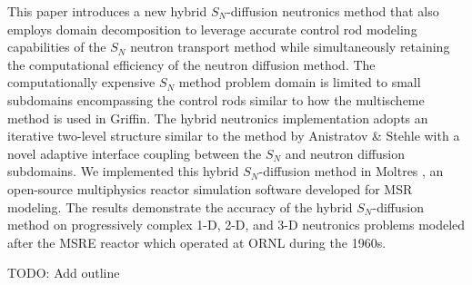 This paper introduces a new hybrid $S_N$-diffusion neutronics method that also employs domain
decomposition to leverage accurate control rod modeling capabilities of the $S_N$ neutron transport
method while simultaneously retaining the computational efficiency of the neutron diffusion method.
The computationally expensive $S_N$ method problem domain is limited to small subdomains
encompassing the control rods similar to how the multischeme method is used in Griffin. The
hybrid neutronics implementation adopts an iterative two-level structure similar to the method by
Anistratov \& Stehle with a novel adaptive interface coupling between the $S_N$ and neutron
diffusion subdomains. We implemented this hybrid $S_N$-diffusion method in Moltres
\cite{lindsay_moltres_2017, park_verification_2022}, an open-source multiphysics reactor simulation
software developed for \gls{MSR} modeling. The results demonstrate the accuracy of the hybrid
$S_N$-diffusion method on progressively complex 1-D, 2-D, and 3-D neutronics problems modeled after
the \gls{MSRE} reactor which operated at \gls{ORNL} during the 1960s.

TODO: Add outline

